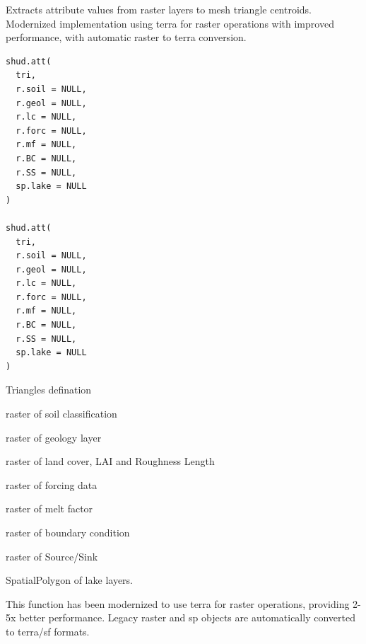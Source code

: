 \documentclass[a4paper]{book}
\begin{document}
%
\begin{Description}\relax
Extracts attribute values from raster layers to mesh triangle centroids.
Modernized implementation using terra for raster operations with improved
performance, with automatic raster to terra conversion.
\end{Description}
%
\begin{Usage}
\begin{verbatim}
shud.att(
  tri,
  r.soil = NULL,
  r.geol = NULL,
  r.lc = NULL,
  r.forc = NULL,
  r.mf = NULL,
  r.BC = NULL,
  r.SS = NULL,
  sp.lake = NULL
)

shud.att(
  tri,
  r.soil = NULL,
  r.geol = NULL,
  r.lc = NULL,
  r.forc = NULL,
  r.mf = NULL,
  r.BC = NULL,
  r.SS = NULL,
  sp.lake = NULL
)
\end{verbatim}
\end{Usage}
%
\begin{Arguments}
\begin{ldescription}
\item[\code{tri}] Triangles defination

\item[\code{r.soil}] raster of soil classification

\item[\code{r.geol}] raster of geology layer

\item[\code{r.lc}] raster of land cover, LAI and Roughness Length

\item[\code{r.forc}] raster of forcing data

\item[\code{r.mf}] raster of melt factor

\item[\code{r.BC}] raster of boundary condition

\item[\code{r.SS}] raster of Source/Sink

\item[\code{sp.lake}] SpatialPolygon of lake layers.
\end{ldescription}
\end{Arguments}
%
\begin{Details}\relax
This function has been modernized to use terra for raster operations,
providing 2-5x better performance. Legacy raster and sp objects are
automatically converted to terra/sf formats.
\end{Details}
\end{document}
